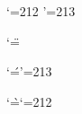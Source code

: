 


\chardef\lq=212 \chardef\rq=213


\catcode`\"=\dblcode		%


\catcode`\'=\active \chardef'=213


\catcode`\`=\active \chardef`=212



